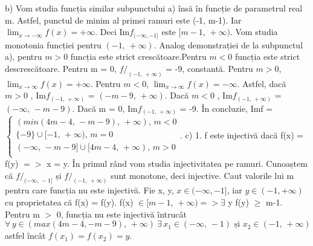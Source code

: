 \documentclass{article}
\begin{document}
\newline
\newline
b) Vom studia funcția similar subpunctului a) însă în funcție de parametrul real m.
\newline
Astfel, punctul de minim al primei ramuri este (-1, m-1). Iar $\lim_{x\to-\infty} f(x) = +\infty$. Deci Im$f_{ (- \infty, -1]}$ este $[m-1, \, +\infty)$.
\newline
Vom studia monotonia funcției pentru $(-1, \, +\infty)$. Analog demonstrației de la subpunctul a), pentru $m > 0$ funcția este strict crescătoare.Pentru $m < 0$ funcția este strict descrescătoare. Pentru m = 0, $f/_{ (-1, \, +\infty)}$ = -9, constantă. 
\newline
Pentru $m > 0$, $\lim_{x\to \infty} f(x) = +\infty$. Pentru $m < 0$, $\lim_{x\to \infty} f(x) = -\infty$.
\newline
Astfel, dacă $m > 0$ , Im$f_{ (-1, \, +\infty)}$ = $(-m-9, \, +\infty)$. Dacă $m < 0$ , Im$f_{ (-1, \, +\infty)}$ = $(-\infty, \, -m-9)$. Dacă m = 0, Im$f_{ (-1, \, +\infty)}$ = {-9}.
\newline
În concluzie, Imf = $\begin{cases} 
    (min(4m-4, \, -m-9), \, +\infty), \, m < 0  \\
    \{-9\} \cup [-1, \, +\infty), \, m = 0 \\
    (-\infty, \, -m-9] \cup [4m-4, \, +\infty), \, m > 0 \\
   \end{cases}$.
\newline
\newline
c) 1. f este injectivă dacă f(x) = f(y) $=>$ x = y. În primul rând vom studia injectivitatea pe ramuri. Cunoaștem că $f/_{ (-\infty, \, -1]}$ și $f/_{ (-1, \, +\infty)}$ sunt monotone, deci injective.
\newline 
Caut valorile lui m pentru care funcția nu este injectivă. Fie x, y, $x \in (-\infty, -1]$, iar $y \in (-1, +\infty)$ cu proprietatea că f(x) = f(y). f(x) $\in [m-1, \, +\infty) =>\exists$ y f(y) $\geq$ m-1.
\newline
Pentru m $>$ 0, funcția nu este injectivă întrucât $\forall \, y \in (max(4m-4, -m-9), \, +\infty)\ \exists \, x_{1} \in (-\infty, \, -1) \text{ și } x_{2} \in (-1, \, +\infty)$ astfel încât $f(x_{1}) = f(x_{2}) = y$. 
\end{document}
